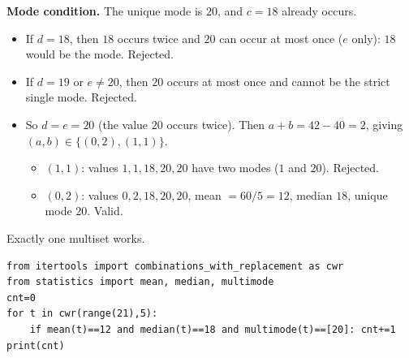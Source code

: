\begin{enumerate}[label=\textbf{Q.\arabic*},leftmargin=*,start=1]
\textbf{Mode condition.} The unique mode is $20$, and $c=18$ already occurs.
\begin{itemize}
 \item If $d=18$, then $18$ occurs twice and $20$ can occur at most once
 ($e$ only): $18$ would be the mode. Rejected.
 \item If $d=19$ or $e\neq 20$, then $20$ occurs at most once and cannot be
 the strict single mode. Rejected.
 \item So $d=e=20$ (the value $20$ occurs twice). Then $a+b=42-40=2$,
 giving $(a,b)\in\{(0,2),(1,1)\}$.
 \begin{itemize}
  \item $(1,1)$: values $1,1,18,20,20$ have two modes ($1$ and $20$). Rejected.
  \item $(0,2)$: values $0,2,18,20,20$, mean $=60/5=12$, median $18$, unique
  mode $20$. Valid.
 \end{itemize}
\end{itemize}
Exactly one multiset works.
\begin{lstlisting}
from itertools import combinations_with_replacement as cwr
from statistics import mean, median, multimode
cnt=0
for t in cwr(range(21),5):
    if mean(t)==12 and median(t)==18 and multimode(t)==[20]: cnt+=1
print(cnt)
\end{lstlisting}


\end{enumerate}

